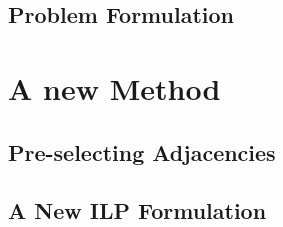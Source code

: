 \documentclass[runningheads]{llncs}
\begin{document}
\subsection{Problem Formulation}
\section{A new Method}
\subsection{Pre-selecting Adjacencies}
\subsection{A New ILP Formulation}
\end{document}
